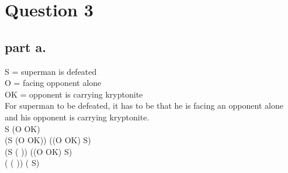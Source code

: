 \section{Question 3}



\subsection{part a.}
S = superman is defeated \\
O = facing opponent alone \\
OK = opponent is carrying kryptonite \\

For superman to be defeated, it has to be that he is facing an opponent alone and his opponent is carrying kryptonite. \\
S \iff (O \land OK) \\
(S \to (O \land OK)) \land ((O \land OK) \to S)                              \\
(S \to ( \lor {})) \land ((O \land OK) \to S)                                           \\
( \lor ( \lor {})) \land ( \lor S)       \\
